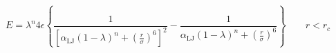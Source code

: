 


\[
E = \lambda^n 4 \epsilon
\left\{
  \frac{1}{ \left[ \alpha_{\mathrm{LJ}} (1-\lambda)^n +
    \left( \displaystyle\frac{r}{\sigma} \right)^6 \right]^2 } -
  \frac{1}{ \alpha_{\mathrm{LJ}} (1-\lambda)^n +
    \left( \displaystyle\frac{r}{\sigma} \right)^6 }
\right\} \qquad r < r_c
 \]


